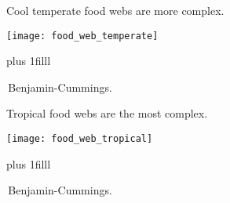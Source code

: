 \documentclass[t]{beamer}
\begin{document}
\begin{frame}[t]{Cool temperate food webs are more complex.}

	\vspace*{-1\baselineskip}
	\begin{center}
		\texttt{[image: food\_web\_temperate]}
	\end{center}
	\vskip0pt plus 1filll
	
\tiny\textcopyright\,Benjamin-Cummings.
\end{frame}

\begin{frame}[t]{Tropical food webs are the most complex.}

	\vspace*{-1\baselineskip}
	\begin{center}
		\texttt{[image: food\_web\_tropical]}
	\end{center}
	\vskip0pt plus 1filll
	
\tiny\textcopyright\,Benjamin-Cummings.
\end{frame}
\end{document}
